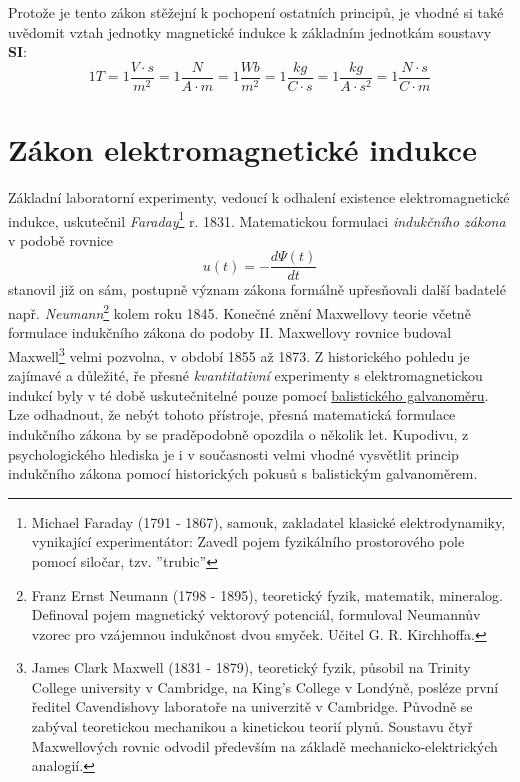     Protože je tento zákon stěžejní k pochopení ostatních principů, je vhodné si také uvědomit
    vztah jednotky magnetické indukce k základním jednotkám soustavy \textbf{SI}: $$1T =
    1\frac{V\cdot s}{m^2} = 1\frac{N}{A\cdot m} = 1\frac{Wb}{m^2} = 1\frac{kg}{C\cdot s} =
    1\frac{kg}{A\cdot s^2} = 1\frac{N\cdot s}{C \cdot m}$$
      
  \section{Zákon elektromagnetické indukce}
    Základní laboratorní experimenty, vedoucí k odhalení existence elektromagnetické indukce,
    uskutečnil \emph{Faraday}\footnote{Michael Faraday (1791 - 1867), samouk, zakladatel klasické
    elektrodynamiky, vynikající experimentátor: Zavedl pojem fyzikálního prostorového pole pomocí
    siločar, tzv. ''trubic''} r. 1831.
    Matematickou formulaci \emph{indukčního zákona} v podobě rovnice
    \begin{equation}
      u(t) = - \frac{d\Psi(t)}{dt}
    \end{equation} 
    stanovil již on sám, postupně význam zákona formálně upřesňovali další badatelé např.
    \emph{Neumann}\footnote{Franz Ernst Neumann (1798 - 1895), teoretický fyzik, matematik,
    mineralog. Definoval pojem magnetický vektorový potenciál, formuloval Neumannův vzorec pro
    vzájemnou indukčnost dvou smyček. Učitel G. R. Kirchhoffa.} kolem roku 1845. Konečné znění
    Maxwellovy teorie včetně formulace indukčního zákona do podoby II. Maxwellovy rovnice budoval
    Maxwell\footnote{James Clark Maxwell (1831 - 1879), teoretický fyzik, působil na Trinity
    College university v Cambridge, na King's College v Londýně, posléze první ředitel Cavendishovy
    laboratoře na univerzitě v Cambridge. Původně se zabýval teoretickou mechanikou a kinetickou
    teorií plynů. Soustavu čtyř Maxwellových rovnic odvodil především na základě
    mechanicko-elektrických analogií.} velmi pozvolna, v období 1855 až 1873. Z historického pohledu
    je zajímavé a důležité, ře přesné \emph{kvantitativní} experimenty s elektromagnetickou indukcí
    byly v té době uskutečnitelné pouze pomocí
    \href{http://en.wikipedia.org/wiki/Galvanometer}{balistického galvanoměru}. Lze odhadnout, že
    nebýt tohoto přístroje, přesná matematická formulace indukčního zákona by se praděpodobně
    opozdila o několik let. Kupodivu, z psychologického hlediska je i v současnosti velmi vhodné
    vysvětlit princip indukčního zákona pomocí historických pokusů s balistickým galvanoměrem.
    
